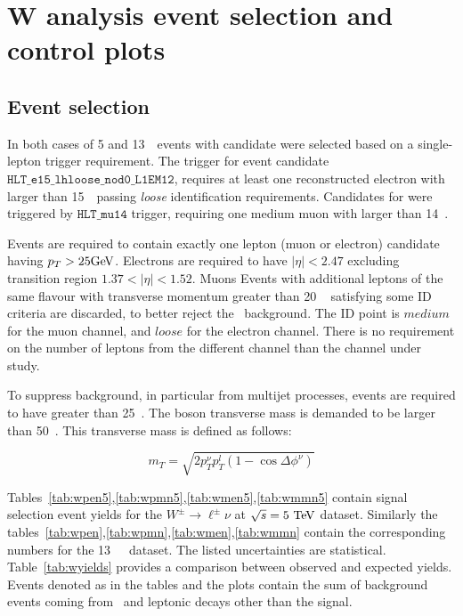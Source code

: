 \section{W analysis event selection and control plots}
\label{sec:selection}

\subsection{Event selection}
\label{subsec:wselection}
In both cases of 5 and 13~\TeV\, events with \Wln{} candidate were selected based on a single-lepton trigger requirement.
The trigger for \Wen event candidate $\texttt{HLT\_e15\_lhloose\_nod0\_L1EM12}$, requires at least one reconstructed electron with \ET larger than 15~\GeV\ passing \emph{loose} identification requirements. Candidates for \Wmn were triggered by $\texttt{HLT\_mu14}$ trigger, requiring one medium muon with \ET larger than 14~\GeV.

Events are required to contain exactly one lepton (muon or electron) candidate having $p_T > 25\text{Ge\kern -0.1em V}$. Electrons are required to have $|\eta|<2.47$ excluding transition region $1.37 < |\eta|< 1.52$. Muons   
Events with additional leptons of the same flavour with transverse momentum greater than 20 ~\GeV{} satisfying some ID criteria are discarded, to better reject the \Zboson\ background. The ID point is $medium$ for the muon channel, and $loose$ for the electron channel. There is no requirement on the number of leptons from the different channel than the channel under study.

To suppress background, in particular from multijet processes,
events are required to have \MET{} greater than 25~\GeV{}.
The \Wboson{} boson transverse mass \mt{} is demanded to be larger than 50~\GeV.
This transverse mass is defined as follows:

\begin{equation}\label{eq:mt}
{m}_{T} = \sqrt{2 {p}_{T}^{\nu}p_{T} ^{l} (1-\cos\Delta\phi^{\nu})}
\end{equation}

Tables~\ref{tab:wpen5},\ref{tab:wpmn5},\ref{tab:wmen5},\ref{tab:wmmn5} contain signal selection event yields for the $W^{\pm} \rightarrow \ell^{\pm}\nu$  at $\sqrt{s} = 5~\text{Te\kern -0.1em V}$ \lowmu dataset. Similarly the tables~\ref{tab:wpen},\ref{tab:wpmn},\ref{tab:wmen},\ref{tab:wmmn} contain the corresponding numbers for the 13~\TeV\ \lowmu\ dataset. The listed uncertainties are statistical. Table~\ref{tab:wyields} provides a comparison between observed and expected yields.
Events denoted as \Wln{} in the tables and the plots contain the sum of background events coming from \Wtaunu\ and \Wboson{} leptonic decays other than the signal.


